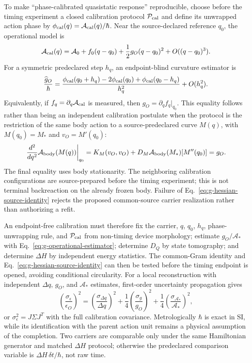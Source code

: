 \documentclass[11pt]{article}
\begin{document}
To make ``phase-calibrated quasistatic response'' reproducible, choose before
the timing experiment a closed calibration protocol \(\mathcal P_{\rm cal}\)
and define its unwrapped action phase by
\(\phi_{\rm cal}(q)=\mathcal A_{\rm cal}(q)/\hbar\).  Near the source-declared
reference \(q_0\), the operational model is
\begin{equation}
  \mathcal A_{\rm cal}(q)
  =\mathcal A_0+f_0(q-q_0)
  +\frac12 g_O(q-q_0)^2+O((q-q_0)^3).
  \label{eq:carrier-calibration-action}
\end{equation}
For a symmetric predeclared step \(h_q\), an endpoint-blind curvature estimator
is
\begin{equation}
  \frac{\widehat g_O}{\hbar}
  =\frac{\phi_{\rm cal}(q_0+h_q)-2\phi_{\rm cal}(q_0)
  +\phi_{\rm cal}(q_0-h_q)}{h_q^2}+O(h_q^2).
  \label{eq:g-operational-estimator}
\end{equation}
Equivalently, if \(f_q=\partial_q\mathcal A_{\rm cal}\) is measured, then
\(g_O=\partial_q f_q|_{q_0}\).  This equality follows rather than being an
independent calibration postulate when the protocol is the restriction of the
same body action to a source-predeclared curve \(M(q)\), with
\(M(q_0)=M_*\) and \(v_O=M'(q_0)\):
\begin{equation}
 \left.\frac{d^2}{dq^2}\mathcal A_{\rm body}(M(q))\right|_{q_0}
 =K_M(v_O,v_O)
 +D_M\mathcal A_{\rm body}(M_*)[M''(q_0)]
 =g_O.
 \label{eq:g-hessian-source-identity}
\end{equation}
The final equality uses body stationarity.  The neighboring calibration
configurations are source-prepared before the timing experiment; this is not
terminal backreaction on the already frozen body.  Failure of
Eq.~\eqref{eq:g-hessian-source-identity} rejects the proposed common-source
carrier realization rather than authorizing a refit.

An endpoint-free calibration must therefore fix the carrier, \(q\), \(q_0\),
\(h_q\), phase-unwrapping rule, and \(\mathcal P_{\rm cal}\) from non-timing
device morphology; estimate \(g_O/\mathcal A_*\) with
Eq.~\eqref{eq:g-operational-estimator}; determine \(D_Q\) by state tomography;
and determine \(\Delta H\) by independent energy statistics.  The common-Gram
identity and Eq.~\eqref{eq:g-hessian-source-identity} can then be tested before
the timing endpoint is opened, avoiding conditional circularity.  For a local
reconstruction with independent \(\Delta q\), \(g_O\), and \(\mathcal A_*\)
estimates, first-order uncertainty propagation gives
\begin{equation}
  \left(\frac{\sigma_{\epsilon}}{\epsilon_O}\right)^2
  =\left(\frac{\sigma_{\Delta q}}{\Delta q}\right)^2
  +\frac14\left(\frac{\sigma_g}{g_O}\right)^2
  +\frac14\left(\frac{\sigma_{\mathcal A_*}}{\mathcal A_*}\right)^2,
  \label{eq:epsilon-uncertainty}
\end{equation}
or \(\sigma_\epsilon^2=J\Sigma J^T\) with the full calibration covariance.
Metrologically \(\hbar\) is exact in SI, while its identification with the
parent action unit remains a physical assumption of the completion.  Two
carriers are comparable only under the same Hamiltonian generator and matched
\(\Delta H\) protocol; otherwise the predeclared comparison variable is
\(\Delta H\,\delta t/\hbar\), not raw time.
\end{document}
